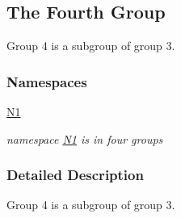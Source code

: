 \hypertarget{group__group4}{}\subsection{The Fourth Group}
\label{group__group4}


Group 4 is a subgroup of group 3.  


\subsubsection*{Namespaces}
\begin{DoxyCompactItemize}
\item 
 \mbox{\hyperlink{namespace_n1}{N1}}
\begin{DoxyCompactList}\small\item\em namespace \mbox{\hyperlink{namespace_n1}{N1}} is in four groups \end{DoxyCompactList}\end{DoxyCompactItemize}


\subsubsection{Detailed Description}
Group 4 is a subgroup of group 3. 

